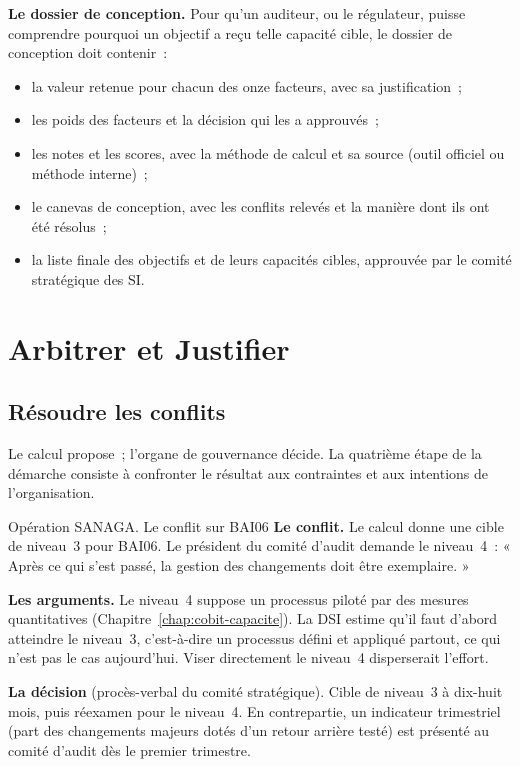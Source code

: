 \begin{boxprocedure}
\textbf{Le dossier de conception.} Pour qu'un auditeur, ou le régulateur,
puisse comprendre pourquoi un objectif a reçu telle capacité cible, le
dossier de conception doit contenir~:
\begin{itemize}
    \item la valeur retenue pour chacun des onze facteurs, avec sa
          justification~;
    \item les poids des facteurs et la décision qui les a approuvés~;
    \item les notes et les scores, avec la méthode de calcul et sa source
          (outil officiel ou méthode interne)~;
    \item le canevas de conception, avec les conflits relevés et la manière
          dont ils ont été résolus~;
    \item la liste finale des objectifs et de leurs capacités cibles,
          approuvée par le comité stratégique des SI.
\end{itemize}
\end{boxprocedure}

\section{Arbitrer et Justifier}
\label{sec:c07-arbitrage}

\subsection{Résoudre les conflits}

Le calcul propose~; l'organe de gouvernance décide. La quatrième étape de
la démarche consiste à confronter le résultat aux contraintes et aux
intentions de l'organisation.

\begin{boxscenario}{Opération SANAGA. Le conflit sur BAI06}
\textbf{Le conflit.} Le calcul donne une cible de niveau~3 pour BAI06. Le
président du comité d'audit demande le niveau~4~: « Après ce qui s'est
passé, la gestion des changements doit être exemplaire. »

\medskip
\textbf{Les arguments.} Le niveau~4 suppose un processus piloté par des
mesures quantitatives (Chapitre~\ref{chap:cobit-capacite}). La DSI estime
qu'il faut d'abord atteindre le niveau~3, c'est-à-dire un processus
défini et appliqué partout, ce qui n'est pas le cas aujourd'hui. Viser
directement le niveau~4 disperserait l'effort.

\medskip
\textbf{La décision} (procès-verbal du comité stratégique). Cible de
niveau~3 à dix-huit mois, puis réexamen pour le niveau~4. En contrepartie,
un indicateur trimestriel (part des changements majeurs dotés d'un
retour arrière testé) est présenté au comité d'audit dès le premier
trimestre.
\end{boxscenario}

